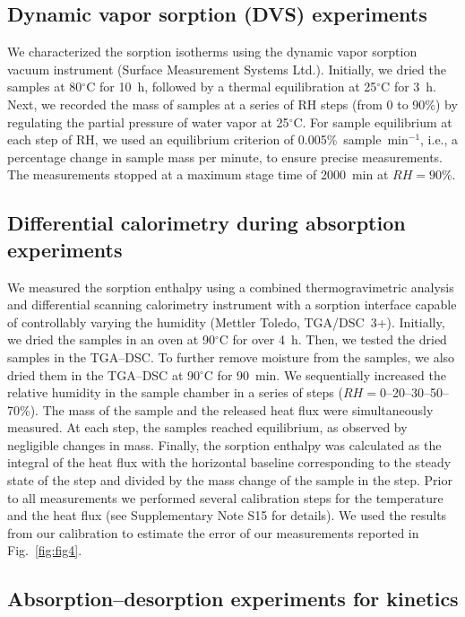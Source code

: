\documentclass[11pt]{article}
\begin{document}
\subsection{Dynamic vapor sorption (DVS) experiments}

We characterized the sorption isotherms using the dynamic vapor sorption vacuum instrument (Surface Measurement Systems Ltd.). Initially, we dried the samples at 80$^\circ$C for 10~h, followed by a thermal equilibration at 25$^\circ$C for 3~h. Next, we recorded the mass of samples at a series of RH steps (from 0 to 90\%) by regulating the partial pressure of water vapor at 25$^\circ$C. For sample equilibrium at each step of RH, we used an equilibrium criterion of 0.005\%~sample~min$^{-1}$, i.e., a percentage change in sample mass per minute, to ensure precise measurements. The measurements stopped at a maximum stage time of 2000~min at $RH = 90\%$.

\subsection{Differential calorimetry during absorption experiments}

We measured the sorption enthalpy using a combined thermogravimetric analysis and differential scanning calorimetry instrument with a sorption interface capable of controllably varying the humidity (Mettler Toledo, TGA/DSC~3+). Initially, we dried the samples in an oven at 90$^\circ$C for over 4~h. Then, we tested the dried samples in the TGA--DSC. To further remove moisture from the samples, we also dried them in the TGA--DSC at 90$^\circ$C for 90~min. We sequentially increased the relative humidity in the sample chamber in a series of steps ($RH = 0$--20--30--50--70\%). The mass of the sample and the released heat flux were simultaneously measured. At each step, the samples reached equilibrium, as observed by negligible changes in mass. Finally, the sorption enthalpy was calculated as the integral of the heat flux with the horizontal baseline corresponding to the steady state of the step and divided by the mass change of the sample in the step. Prior to all measurements we performed several calibration steps for the temperature and the heat flux (see Supplementary Note S15 for details). We used the results from our calibration to estimate the error of our measurements reported in Fig.~\ref{fig:fig4}.

\subsection{Absorption--desorption experiments for kinetics}
\end{document}

